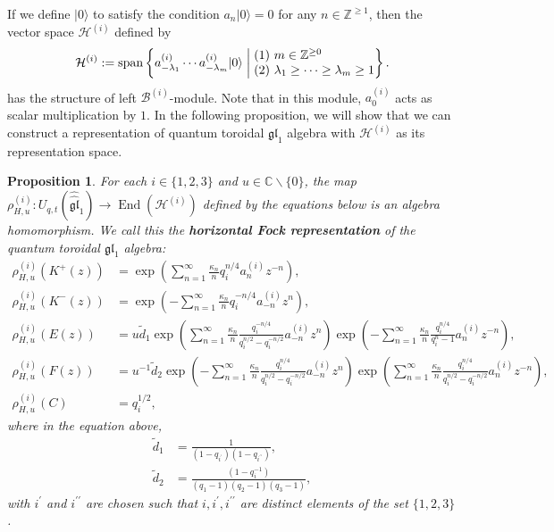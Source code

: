 \documentclass[12pt,reqno,a4paper]{amsart}
\newcommand{\cals}[1]{\mathcal{#1}}
\newcommand{\fraks}[1]{\mathfrak{#1}}
\newcommand{\bb}[1]{\mathbb{#1}}
\numberwithin{equation}{section}
\newtheorem{prop}[thm]{Proposition}
\theoremstyle{definition}
\begin{document}
If we define $|0\rangle$ to satisfy the condition $a_n|0\rangle = 0$ for any $n \in \bb{Z}^{\geq 1}$, then the vector space $\cals{H}^{(i)}$ defined by 
\begin{align}
	\cals{H}^{(i)} := \operatorname{span}
	\left\{
	a^{(i)}_{-\lambda_1}\cdots a^{(i)}_{-\lambda_m}|0\rangle
	\;\middle\vert\;
	\begin{array}{@{}l@{}}
		(1) \,\,  m \in \bb{Z}^{\geq 0}\\
		(2) \,\, \lambda_1 \geq \cdots \geq \lambda_m \geq 1
	\end{array}
	\right\}.
\end{align}
has the structure of left $\cals{B}^{(i)}$-module. Note that in this module, $a^{(i)}_0$ acts as scalar multiplication by $1$. In the following proposition, we will show that we can construct a representation of quantum toroidal $\fraks{gl}_1$ algebra with $\cals{H}^{(i)}$ as its representation space. 

\begin{prop}
For each $i \in \{1,2,3\}$ and $u \in \bb{C}\backslash\{0\}$, the map $\rho_{H,u}^{(i)} : U_{q,t}(\widehat{\widehat{\fraks{gl}}}_1)
\rightarrow \operatorname{End}(\cals{H}^{(i)})$ defined by the equations below is an algebra homomorphism. We call this the \textbf{horizontal Fock representation} of the quantum toroidal $\fraks{gl}_1$ algebra:
\begin{align}
	\rho_{H,u}^{(i)}\left(
	K^+(z)
	\right)
	&= 
	\exp\left(
	\sum_{n = 1}^{\infty}\frac{\kappa_n}{n}q^{n/4}_ia^{(i)}_{n}z^{-n}
	\right),
	\\
	\rho_{H,u}^{(i)}
	\left(
	K^-(z)
	\right)
	&= 
	\exp\left(
	- \sum_{n = 1}^{\infty}\frac{\kappa_n}{n}q^{-n/4}_{i}
	a^{(i)}_{-n}z^n
	\right),
	\\
	\rho_{H,u}^{(i)}
	\left(
	E(z)
	\right)
	&= u\widetilde{d}_1
	\exp\left(
	\sum_{n = 1}^{\infty}
	\frac{\kappa_n}{n}
	\frac{q^{-n/4}_i}{q^{n/2}_{i} - q^{-n/2}_{i}}
	a^{(i)}_{-n}z^n
	\right)
	\exp\left(
	-\sum_{n = 1}^{\infty}
	\frac{\kappa_n}{n}
	\frac{q^{n/4}_i}{q^{n}_{i}  - 1}
	a^{(i)}_{n}z^{-n}
	\right),
	\\
	\rho_{H,u}^{(i)}
	\left(
	F(z)
	\right)
	&= 
	u^{-1}\widetilde{d}_2
	\exp\left(
	-\sum_{n = 1}^{\infty}
	\frac{\kappa_n}{n}
	\frac{q^{n/4}_i}{q^{n/2}_{i} - q^{-n/2}_{i}}
	a^{(i)}_{-n}z^{n}
	\right)
	\exp\left(
	\sum_{n = 1}^{\infty}
	\frac{\kappa_n}{n}
	\frac{q^{n/4}_i}{q^{n/2}_{i} - q^{-n/2}_{i}}
	a^{(i)}_{n}z^{-n}
	\right),
	\\
	\rho_{H,u}^{(i)}
	\left(
	C
	\right)
	&= q^{1/2}_{i},
\end{align}
where in the equation above, 
\begin{align}
	\widetilde{d}_1 &= 
	\frac{
		1
	}{
		(1 - q_{i^\prime})
		(1 - q_{i^{\prime\prime}})
	}, 
	\label{eqn315-2135}
	\\
	\widetilde{d}_2 &=
	\frac{
		(1 - q^{-1}_i)
	}{
		(q_1 - 1)(q_2 - 1)(q_3 - 1)
	},
\end{align}
with $i^\prime$ and $i^{\prime\prime}$ are chosen such that $i, i^\prime, i^{\prime\prime}$ are distinct elements of the set $\{1,2,3\}$. 
\end{prop}
\end{document}
